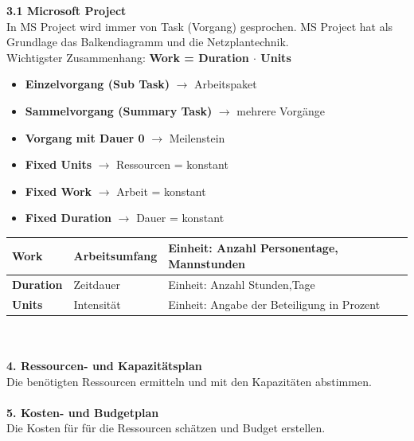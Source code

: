\clearpage

\textbf{3.1 Microsoft Project}\\
In MS Project wird immer von Task (Vorgang) gesprochen.\newline
MS Project hat als Grundlage das Balkendiagramm und die Netzplantechnik.\\
Wichtigster Zusammenhang: \textbf{Work = Duration $\cdot$ Units}\\
\begin{multicols}{2}
	\begin{itemize}
		\item \textbf{Einzelvorgang (Sub Task)} $\rightarrow$ Arbeitspaket
		\item \textbf{Sammelvorgang (Summary Task)} \newline $\rightarrow$ mehrere Vorgänge
		\item \textbf{Vorgang mit Dauer 0} $\rightarrow$ Meilenstein	
	\end{itemize}
	\begin{itemize}
		\item \textbf{Fixed Units} $\rightarrow$ Ressourcen = konstant
		\item \textbf{Fixed Work} $\rightarrow$ Arbeit = konstant
		\item \textbf{Fixed Duration} $\rightarrow$ Dauer = konstant
	\end{itemize}
\end{multicols}

\begin{tabular}{|l|l|l|}
	\hline \textbf{Work}& Arbeitsumfang & Einheit: Anzahl Personentage, Mannstunden\\
	\hline \textbf{Duration} & Zeitdauer & Einheit: Anzahl Stunden,Tage\\
	\hline \textbf{Units}& Intensität& Einheit: Angabe der Beteiligung in Prozent\\
	\hline
\end{tabular}\\\\
\textbf{4. Ressourcen- und Kapazitätsplan}\\
Die benötigten Ressourcen ermitteln und mit den Kapazitäten abstimmen. 
\\
\\
\textbf{5. Kosten- und Budgetplan}\\
Die Kosten für für die Ressourcen schätzen und Budget erstellen. 


